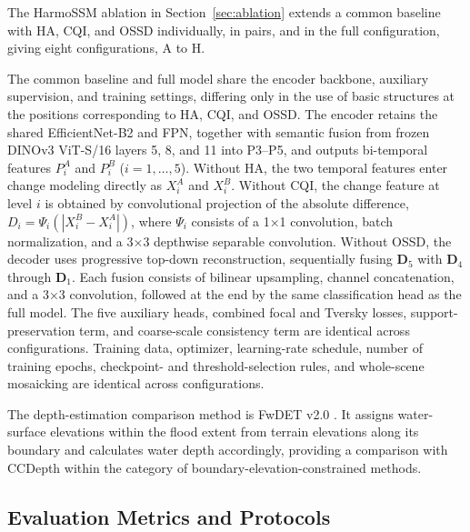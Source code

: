 \documentclass[authoryear,preprint,12pt]{elsarticle}
\begin{document}
The HarmoSSM ablation in Section~\ref{sec:ablation} extends a common baseline with HA, CQI, and OSSD individually, in pairs, and in the full configuration, giving eight configurations, A to H.

The common baseline and full model share the encoder backbone, auxiliary supervision, and training settings, differing only in the use of basic structures at the positions corresponding to HA, CQI, and OSSD. The encoder retains the shared EfficientNet-B2 and FPN, together with semantic fusion from frozen DINOv3 ViT-S/16 layers 5, 8, and 11 into P3--P5, and outputs bi-temporal features \(P_i^A\) and \(P_i^B\) (\(i=1,\dots,5\)). Without HA, the two temporal features enter change modeling directly as \(X_i^A\) and \(X_i^B\). Without CQI, the change feature at level \(i\) is obtained by convolutional projection of the absolute difference, \(D_i=\Psi_i(|X_i^B-X_i^A|)\), where \(\Psi_i\) consists of a 1×1 convolution, batch normalization, and a 3×3 depthwise separable convolution. Without OSSD, the decoder uses progressive top-down reconstruction, sequentially fusing \(\mathbf D_5\) with \(\mathbf D_4\) through \(\mathbf D_1\). Each fusion consists of bilinear upsampling, channel concatenation, and a 3×3 convolution, followed at the end by the same classification head as the full model. The five auxiliary heads, combined focal and Tversky losses, support-preservation term, and coarse-scale consistency term are identical across configurations. Training data, optimizer, learning-rate schedule, number of training epochs, checkpoint- and threshold-selection rules, and whole-scene mosaicking are identical across configurations.

The depth-estimation comparison method is FwDET v2.0 \citep{cohen2019floodwater}. It assigns water-surface elevations within the flood extent from terrain elevations along its boundary and calculates water depth accordingly, providing a comparison with CCDepth within the category of boundary-elevation-constrained methods.

\subsection{Evaluation Metrics and Protocols}\label{sec:experiment_metrics}
\end{document}
